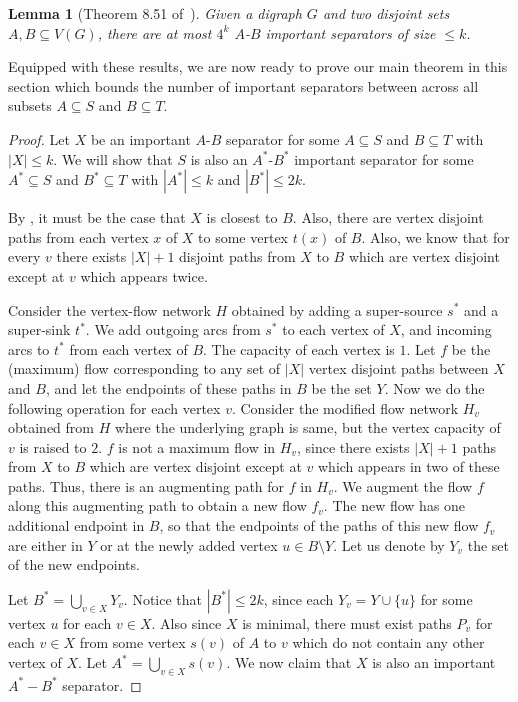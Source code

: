 \documentclass[11pt]{article}
\newtheorem{lemma}[theorem]{Lemma}
\begin{document}
\begin{lemma}[Theorem 8.51 of~\cite{cygan2015parameterized}]
Given a digraph $G$ and two disjoint sets $A,B \subseteq V(G)$, there are at most $4^k$ $A$-$B$ important separators of size $\leq k$.
\end{lemma}

Equipped with these results, we are now ready to prove our main theorem in this section which bounds the number of important separators between across all subsets $A \subseteq S$ and $B \subseteq T$.

\impsep*

\begin{proof}
Let $X$ be an important $A$-$B$ separator for some $A \subseteq S$ and $B \subseteq T$ with $|X| \leq k$. We will show that $S$ is also an $A^*$-$B^*$ important separator for some $A^* \subseteq S$ and $B^* \subseteq T$ with $|A^*| \leq k$ and $|B^*| \leq 2k$.

By , it must be the case that $X$ is closest to $B$. Also, there are vertex disjoint paths from each vertex $x$ of $X$ to some vertex $t(x)$ of $B$. Also, we know that for every $v$ there exists $|X| + 1$ disjoint paths from $X$ to $B$ which are vertex disjoint except at $v$ which appears twice.

Consider the vertex-flow network $H$ obtained by adding a super-source $s^*$ and a super-sink $t^*$. We add outgoing arcs from $s^*$ to each vertex of $X$, and incoming arcs to $t^*$ from each vertex of $B$. The capacity of each vertex is $1$. Let $f$ be the (maximum) flow corresponding to any set of $|X|$ vertex disjoint paths between $X$ and $B$, and let the endpoints of these paths in $B$ be the set $Y$. Now we do the following operation for each vertex $v$. Consider the modified flow network $H_v$ obtained from $H$ where the underlying graph is same, but the vertex capacity of $v$ is raised to $2$. $f$ is not a maximum flow in $H_v$, since there exists $|X| + 1$ paths from $X$ to $B$ which are vertex disjoint except at $v$ which appears in two of these paths. Thus, there is an augmenting path for $f$ in $H_v$. We augment the flow $f$ along this augmenting path to obtain a new flow $f_v$. The new flow has one additional endpoint in $B$, so that the endpoints of the paths of this new flow $f_v$ are either in $Y$ or at the newly added vertex $u \in B \setminus Y$. Let us denote by $Y_v$ the set of the new endpoints. 

Let $B^* = \bigcup_{v \in X} Y_v$. Notice that $|B^*| \leq 2k$, since each $Y_v = Y \cup \{u\}$ for some vertex $u$ for each $v \in X$. Also since $X$ is minimal, there must exist paths $P_v$ for each $v \in X$ from some vertex $s(v)$ of $A$ to $v$ which do not contain any other vertex of $X$. Let $A^* = \bigcup_{v \in X} s(v)$. We now claim that $X$ is also an important $A^*-B^*$ separator.


\end{proof}
\end{document}
